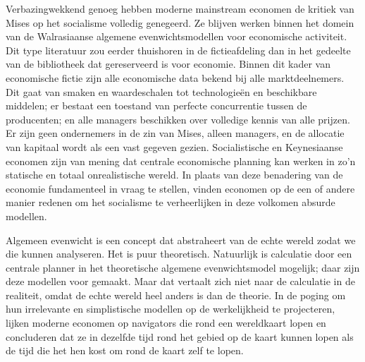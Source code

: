 \documentclass[
  a5paper,
  smalldemyvopaper,11pt,twoside,onecolumn,openright,extrafontsizes,
hidelinks]{memoir}
\begin{document}
Verbazingwekkend genoeg hebben moderne mainstream economen de kritiek
van Mises op het socialisme volledig genegeerd. Ze blijven werken binnen
het domein van de Walrasiaanse algemene evenwichtsmodellen voor
economische activiteit. Dit type literatuur zou eerder thuishoren in de
fictieafdeling dan in het gedeelte van de bibliotheek dat gereserveerd
is voor economie. Binnen dit kader van economische fictie zijn alle
economische data bekend bij alle marktdeelnemers. Dit gaat van smaken en
waardeschalen tot technologieën en beschikbare middelen; er bestaat een
toestand van perfecte concurrentie tussen de producenten; en alle
managers beschikken over volledige kennis van alle prijzen. Er zijn geen
ondernemers in de zin van Mises, alleen managers, en de allocatie van
kapitaal wordt als een vast gegeven gezien. Socialistische en
Keynesiaanse economen zijn van mening dat centrale economische planning
kan werken in zo'n statische en totaal onrealistische wereld. In plaats
van deze benadering van de economie fundamenteel in vraag te stellen,
vinden economen op de een of andere manier redenen om het socialisme te
verheerlijken in deze volkomen absurde modellen.

Algemeen evenwicht is een concept dat abstraheert van de echte wereld
zodat we die kunnen analyseren. Het is puur theoretisch. Natuurlijk is
calculatie door een centrale planner in het theoretische algemene
evenwichtsmodel mogelijk; daar zijn deze modellen voor gemaakt. Maar dat
vertaalt zich niet naar de calculatie in de realiteit, omdat de echte
wereld heel anders is dan de theorie. In de poging om hun irrelevante en
simplistische modellen op de werkelijkheid te projecteren, lijken
moderne economen op navigators die rond een wereldkaart lopen en
concluderen dat ze in dezelfde tijd rond het gebied op de kaart kunnen
lopen als de tijd die het hen kost om rond de kaart zelf te lopen.
\end{document}
